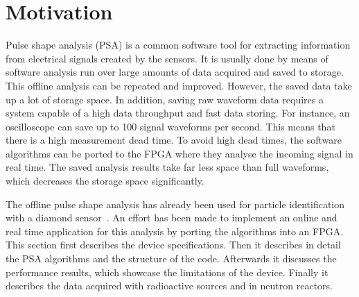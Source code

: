 

\section{Motivation}
\label{sec:rtpi}
Pulse shape analysis (PSA) is a common software tool for extracting information from electrical signals created by the sensors. It is usually done by means of software analysis run over large amounts of data acquired and saved to storage. This offline analysis can be repeated and improved. However, the saved data take up a lot of storage space. In addition, saving raw waveform data requires a system capable of a high data throughput and fast data storing. For instance, an oscilloscope can save up to 100 signal waveforms per second. This means that there is a high measurement dead time. To avoid high dead times, the software algorithms can be ported to the FPGA where they analyse the incoming signal in real time. The saved analysis results take far less space than full waveforms, which decreases the storage space significantly.

The offline pulse shape analysis has already been used for particle identification with a diamond sensor~\cite{PAVEL:00000, PAVEL:00002}. An effort has been made to implement an online and real time application for this analysis by porting the algorithms into an FPGA. This section first describes the device specifications. Then it describes in detail the PSA algorithms and the structure of the code. Afterwards it discusses the performance results, which showcase the limitations of the device. Finally it describes the data acquired with radioactive sources and in neutron reactors.


